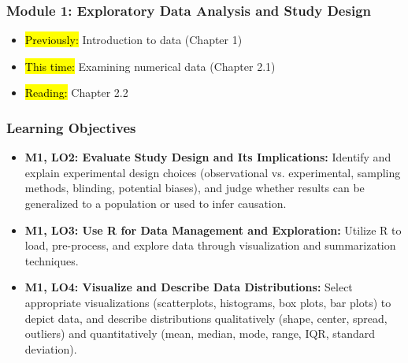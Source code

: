 
\begin{frame}
    \frametitle{Module 1: Exploratory Data Analysis and Study Design}
    \begin{itemize}
        \item \hl{Previously: }Introduction to data (Chapter 1)
        \item \hl{This time: }Examining numerical data (Chapter 2.1)
        \item \hl{Reading: }Chapter 2.2
    \end{itemize}

\end{frame}
\begin{frame}
    \frametitle{Learning Objectives}
    \begin{itemize}
        \item \textbf{M1, LO2: Evaluate Study Design and Its Implications:} Identify and explain experimental design choices (observational vs. experimental, sampling methods, blinding, potential biases), and judge whether results can be generalized to a population or used to infer causation.
        \item \textbf{M1, LO3: Use R for Data Management and Exploration:} Utilize R to load, pre-process, and explore data through visualization and summarization techniques.
        \item \textbf{M1, LO4: Visualize and Describe Data Distributions:} Select appropriate visualizations (scatterplots, histograms, box plots, bar plots) to depict data, and describe distributions qualitatively (shape, center, spread, outliers) and quantitatively (mean, median, mode, range, IQR, standard deviation).
    \end{itemize}
\end{frame}
